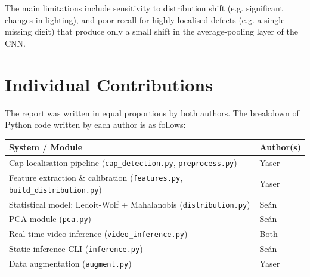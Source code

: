 \documentclass[conference]{IEEEtran}
\begin{document}
The main limitations include sensitivity to distribution shift (e.g. significant changes in lighting), and poor recall for highly localised defects (e.g. a single missing digit) that produce only a small shift in the average-pooling layer of the CNN.

\section{Individual Contributions}
The report was written in equal proportions by both authors.
The breakdown of Python code written by each author is as follows:
\begin{table}[h]
\centering
\label{tab:contrib}
\small
\renewcommand{\arraystretch}{1.5}
\begin{tabular}{>{\raggedright\arraybackslash}p{4cm}>{\raggedright\arraybackslash}p{1.5cm}}
\hline
\textbf{System / Module} & \textbf{Author(s)} \\
\hline
Cap localisation pipeline
(\texttt{cap\_detection.py}, \texttt{preprocess.py})
& Yaser \\
Feature extraction \& calibration
(\texttt{features.py}, \texttt{build\_distribution.py})
& Yaser \\
Statistical model: Ledoit-Wolf + Mahalanobis
(\texttt{distribution.py})
& Seán \\
PCA module (\texttt{pca.py})
& Seán \\
Real-time video inference
(\texttt{video\_inference.py})
& Both \\
Static inference CLI (\texttt{inference.py})
& Seán \\
Data augmentation (\texttt{augment.py})
& Yaser \\
\hline
\end{tabular}
\end{table}
\end{document}

